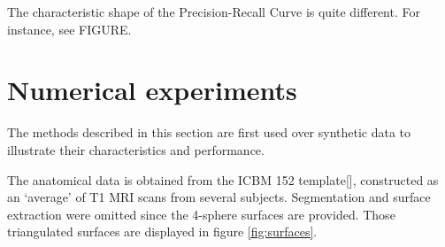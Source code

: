 The characteristic shape of the Precision-Recall Curve is quite different. 
%
For instance, see FIGURE.


\section{Numerical experiments}

The methods described in this section are first used over synthetic data to illustrate their characteristics and performance.

The anatomical data is obtained from the ICBM 152 template[], constructed as an `average' of T1 MRI scans from several subjects.
%
Segmentation and surface extraction were omitted since the 4-sphere surfaces are provided.
%
Those triangulated surfaces are displayed in figure \ref{fig:surfaces}.


